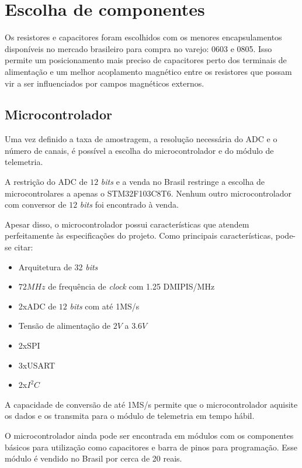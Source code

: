 \documentclass[11pt]{abntex2}
\begin{document}
	\chapter{Escolha de componentes}
		Os resistores e capacitores foram escolhidos com os menores
		encapsulamentos disponíveis no mercado brasileiro para compra no varejo:
		0603 e 0805. Isso permite um posicionamento mais preciso de capacitores
		perto dos terminais de alimentação e um melhor acoplamento magnético
		entre os resistores que possam vir a ser influenciados por campos
		magnéticos externos.
		
		\section{Microcontrolador}
			Uma vez definido a taxa de amostragem, a resolução necessária do
			ADC e o número de canais, é possível a escolha do
			microcontrolador e do módulo de telemetria.

			A restrição do ADC de $12$ \textit{bits} e a venda no Brasil
			restringe a escolha de microcontrolares a apenas o
			STM32F103C8T6.\cite{stm} Nenhum outro microcontrolador com conversor de
			$12$ \textit{bits} foi encontrado à venda.

			Apesar disso, o microcontrolador possui características que
			atendem perfeitamente às especificações do projeto. Como
			principais características, pode-se citar:

			\begin{itemize}
				\item Arquitetura de 32 \textit{bits}
				\item $72MHz$ de frequência de \textit{clock} com 1.25 DMIPIS/MHz
				\item 2xADC de $12$ \textit{bits} com até 1MS/s
				\item Tensão de alimentação de $2V$ a $3.6V$
				\item 2xSPI
				\item 3xUSART
				\item 2x$I^2C$
			\end{itemize}

			A capacidade de conversão de até 1MS/s permite que o
			microcontrolador aquisite os dados e os transmita para o módulo
			de telemetria em tempo hábil.
			
			O microcontrolador ainda pode ser encontrada em módulos com os
			componentes básicos para utilização como capacitores e barra de
			pinos para programação. Esse módulo é vendido no Brasil por
			cerca de 20 reais.
\end{document}
